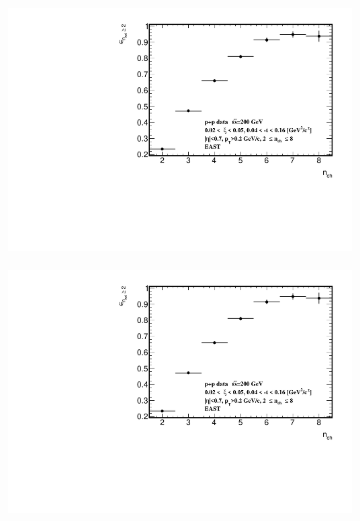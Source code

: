 \begin{figure}[h!]
	\centering
	\vspace{-2.5cm}
	\begin{subfigure}{.49\textwidth}
		\includegraphics[width=\textwidth,page=63]{chapters/chrgSTAR/img/syst/outSD.pdf}
	\end{subfigure}
	\begin{subfigure}{.49\textwidth}
		\includegraphics[width=\textwidth,page=73]{chapters/chrgSTAR/img/syst/outSD.pdf}
	\end{subfigure}
	\begin{subfigure}{.49\textwidth}

\end{subfigure}
\end{figure}
